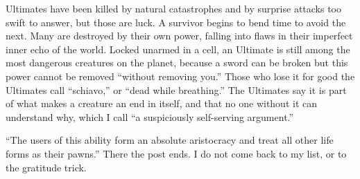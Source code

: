 Ultimates have been killed by natural catastrophes and by surprise attacks too swift to answer, but those are luck. A survivor begins to bend time to avoid the next. Many are destroyed by their own power, falling into flaws in their imperfect inner echo of the world. Locked unarmed in a cell, an Ultimate is still among the most dangerous creatures on the planet, because a sword can be broken but this power cannot be removed ``without removing you.'' Those who lose it for good the Ultimates call ``schiavo,'' or ``dead while breathing.''  The Ultimates say it is part of what makes a creature an end in itself, and that no one without it can understand why, which I call ``a suspiciously self-serving argument.''

``The users of this ability form an absolute aristocracy and treat all other life forms as their pawns.'' There the post ends. I do not come back to my list, or to the gratitude trick.
